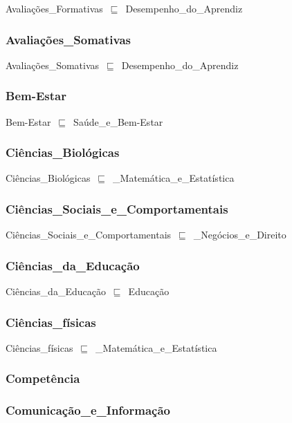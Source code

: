 \documentclass{article}
\begin{document}
Avaliações\_Formativas~\ensuremath{\sqsubseteq}~Desempenho\_do\_Aprendiz~

\subsubsection*{Avaliações\_Somativas}

Avaliações\_Somativas~\ensuremath{\sqsubseteq}~Desempenho\_do\_Aprendiz~

\subsubsection*{Bem-Estar}

Bem-Estar~\ensuremath{\sqsubseteq}~Saúde\_e\_Bem-Estar~

\subsubsection*{Ciências\_Biológicas}

Ciências\_Biológicas~\ensuremath{\sqsubseteq}~\_Matemática\_e\_Estatística~

\subsubsection*{Ciências\_Sociais\_e\_Comportamentais}

Ciências\_Sociais\_e\_Comportamentais~\ensuremath{\sqsubseteq}~\_Negócios\_e\_Direito~

\subsubsection*{Ciências\_da\_Educação}

Ciências\_da\_Educação~\ensuremath{\sqsubseteq}~Educação~

\subsubsection*{Ciências\_físicas}

Ciências\_físicas~\ensuremath{\sqsubseteq}~\_Matemática\_e\_Estatística~

\subsubsection*{Competência}

\subsubsection*{Comunicação\_e\_Informação}
\end{document}
